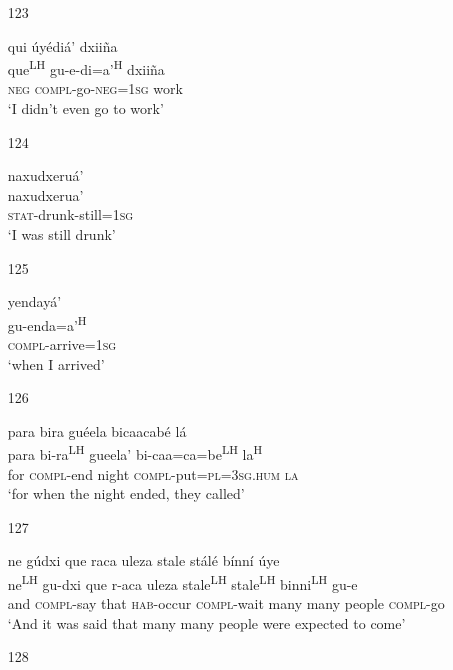 \begin{itemize}
\item[123]
 
\glll  qui \'{u}y\'{e}di\'{a}' dxii\~{n}a \\ 
que\textsuperscript{LH} gu-e-di=a'\textsuperscript{H} dxii\~{n}a \\ 
\textsc{neg} \textsc{compl}-go-\textsc{neg}=\textsc{1sg} work\\
\glt `I didn't even go to work'
 


\item[124]
 
\glll   naxudxeru\'{a}' \\
naxudxerua'\\
  \textsc{stat}-drunk-still=\textsc{1sg}\\
\glt `I was still drunk'
 


\item[125]
 
\glll   yenday\'{a}' \\ 
gu-enda=a'\textsuperscript{H}\\
  \textsc{compl}-arrive=\textsc{1sg}\\
\glt `when I arrived'
 


\item[126]
  
\glll   para bira gu\'{e}ela bicaacab\'{e} l\'{a} \\
para bi-ra\textsuperscript{LH} gueela' bi-caa=ca=be\textsuperscript{LH} la\textsuperscript{H}\\
for \textsc{compl}-end night \textsc{compl}-put=\textsc{pl}=\textsc{3sg.hum} \textsc{la}\\
\glt `for when the night ended, they called'
 


\item[127]
 
\glll  ne g\'{u}dxi que raca uleza stale st\'{a}l\'{e} b\'{i}nn\'{i} \'{u}ye\\
ne\textsuperscript{LH} gu-dxi que r-aca uleza stale\textsuperscript{LH} stale\textsuperscript{LH} binni\textsuperscript{LH} gu-e\\
and \textsc{compl}-say that \textsc{hab}-occur \textsc{compl}-wait many many people \textsc{compl}-go\\
\glt `And it was said that many many people were expected to come'
 



\item[128]
 

\end{itemize}
